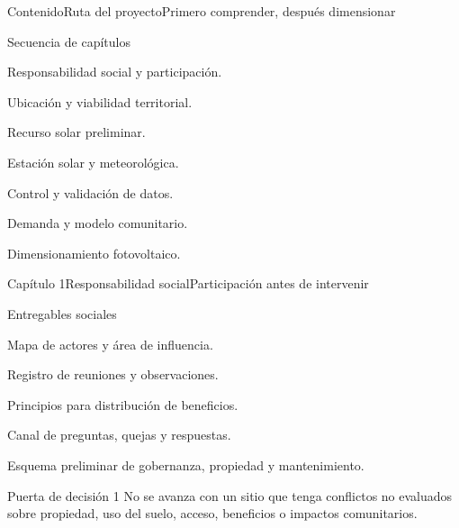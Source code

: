 \documentclass{hvtbook}
\begin{document}
\HVTMakeTitle

\begin{HVTPage}{Contenido}{Ruta del proyecto}{Primero comprender, después dimensionar}
\begin{HVTTaskOrdered}{Secuencia de capítulos}
  \item Responsabilidad social y participación.
  \item Ubicación y viabilidad territorial.
  \item Recurso solar preliminar.
  \item Estación solar y meteorológica.
  \item Control y validación de datos.
  \item Demanda y modelo comunitario.
  \item Dimensionamiento fotovoltaico.
\end{HVTTaskOrdered}
\end{HVTPage}

\begin{HVTPage}{Capítulo 1}{Responsabilidad social}{Participación antes de intervenir}
\begin{HVTFlow}
\end{HVTFlow}
\begin{HVTTask}{Entregables sociales}
  \item Mapa de actores y área de influencia.
  \item Registro de reuniones y observaciones.
  \item Principios para distribución de beneficios.
  \item Canal de preguntas, quejas y respuestas.
  \item Esquema preliminar de gobernanza, propiedad y mantenimiento.
\end{HVTTask}
\begin{HVTWarning}{Puerta de decisión 1}
No se avanza con un sitio que tenga conflictos no evaluados sobre propiedad, uso del suelo, acceso, beneficios o impactos comunitarios.
\end{HVTWarning}
\end{HVTPage}
\end{document}
